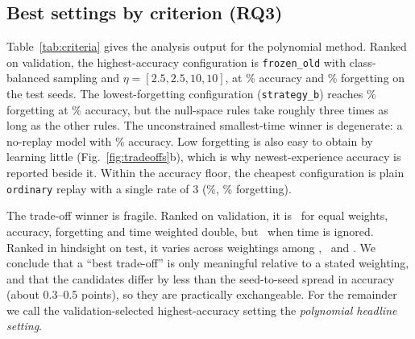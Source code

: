\documentclass[11pt,a4paper]{article}
\newcommand{\RQ}[1]{\textbf{RQ#1}}
\begin{document}
\subsection{Best settings by criterion (\RQ{3})}
Table~\ref{tab:criteria} gives the analysis output for the polynomial method. Ranked on validation, the highest-accuracy configuration is \texttt{frozen\_old} with class-balanced sampling and $\eta=[2.5,2.5,10,10]$, at \numPolyBestAcc\% accuracy and \numPolyBestForg\% forgetting on the test seeds. The lowest-forgetting configuration (\texttt{strategy\_b}) reaches \numPolyValidationminForgettingForg\% forgetting at \numPolyValidationminForgettingAcc\% accuracy, but the null-space rules take roughly three times as long as the other rules. The unconstrained smallest-time winner is degenerate: a no-replay model with \numPolyValidationminTimeAcc\% accuracy. Low forgetting is also easy to obtain by learning little (Fig.~\ref{fig:tradeoffs}b), which is why newest-experience accuracy is reported beside it. Within the accuracy floor, the cheapest configuration is plain \texttt{ordinary} replay with a single rate of 3 (\numPolyValidationFloorminTimeAcc\%, \numPolyValidationFloorminTimeForg\% forgetting).

The trade-off winner is fragile. Ranked on validation, it is \numSensValidationEqualWeights\ for equal weights, accuracy, forgetting and time weighted double, but \numSensValidationTimeIgnored\ when time is ignored. Ranked in hindsight on test, it varies across weightings among \numSensTestEqualWeights, \numSensTestAccuracyX\ and \numSensTestTimeIgnored. We conclude that a ``best trade-off'' is only meaningful relative to a stated weighting, and that the candidates differ by less than the seed-to-seed spread in accuracy (about 0.3--0.5 points), so they are practically exchangeable. For the remainder we call the validation-selected highest-accuracy setting the \emph{polynomial headline setting}.

\begin{table}[t]
\centering\scriptsize
\resizebox{\textwidth}{!}{}
\caption{Polynomial CIL: the four selection criteria under two ranking bases (output of the analysis script). ``Floor'' restricts the pool to candidates within 2 points of the best accuracy. Accuracy and forgetting: mean $\pm$ s.d.\ over test seeds 3--9; ``Newest'' is accuracy on the last experience; $t_{\rm log}$: time recorded in the study logs on the original machine; $t_{\rm here}$: time re-measured on the machine used for the comparison with ER-MLP.}
\label{tab:criteria}
\end{table}
\end{document}
